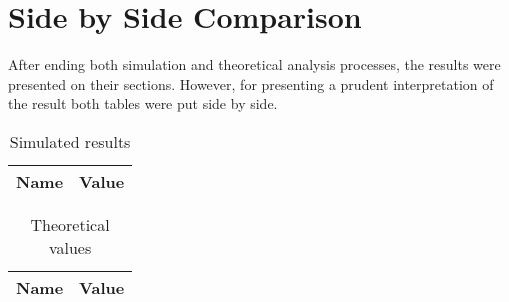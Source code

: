\section{Side by Side Comparison}
\label{sec:comparison}

After ending both simulation and theoretical analysis processes, the results were presented on their sections. However, for presenting a prudent interpretation of the result both tables were put side by side.

\begin{table}[h]
  \centering
  \begin{tabular}{|l|r|}
    \hline    
    {\bf Name} & {\bf Value } \\ \hline
    
  \end{tabular}
  \caption{Simulated results}
  
  \label{tab:sim}
\end{table}

\begin{table}[h]
  \centering
  \begin{tabular}{|l|r|}
    \hline    
    {\bf Name} & {\bf Value } \\ \hline
    
  \end{tabular}
  \caption{Theoretical values}
  \label{tab:tab1}
\end{table}










